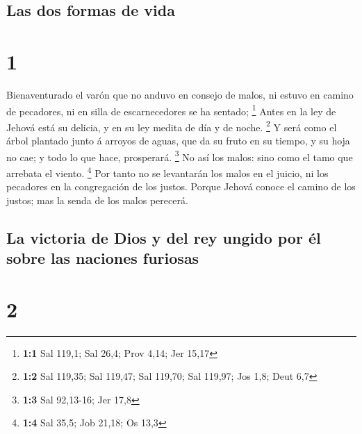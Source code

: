 \hypertarget{las-dos-formas-de-vida}{%
\subsection{Las dos formas de vida}\label{las-dos-formas-de-vida}}

\hypertarget{section}{%
\section{1}\label{section}}

 Bienaventurado el varón que no anduvo en consejo de malos,
ni estuvo en camino de pecadores, ni en silla de escarnecedores se ha
sentado; \footnote{\textbf{1:1} Sal 119,1; Sal 26,4; Prov 4,14; Jer
  15,17}  Antes en la ley de Jehová está su delicia, y en su
ley medita de día y de noche. \footnote{\textbf{1:2} Sal 119,35; Sal
  119,47; Sal 119,70; Sal 119,97; Jos 1,8; Deut 6,7}  Y será
como el árbol plantado junto á arroyos de aguas, que da su fruto en su
tiempo, y su hoja no cae; y todo lo que hace, prosperará. \footnote{\textbf{1:3}
  Sal 92,13-16; Jer 17,8}  No así los malos: sino como el
tamo que arrebata el viento. \footnote{\textbf{1:4} Sal 35,5; Job 21,18;
  Os 13,3}  Por tanto no se levantarán los malos en el
juicio, ni los pecadores en la congregación de los justos. 
Porque Jehová conoce el camino de los justos; mas la senda de los malos
perecerá.

\hypertarget{la-victoria-de-dios-y-del-rey-ungido-por-uxe9l-sobre-las-naciones-furiosas}{%
\subsection{La victoria de Dios y del rey ungido por él sobre las
naciones
furiosas}\label{la-victoria-de-dios-y-del-rey-ungido-por-uxe9l-sobre-las-naciones-furiosas}}

\hypertarget{section-1}{%
\section{2}\label{section-1}}


